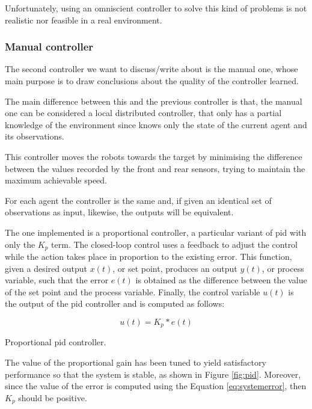 Unfortunately, using an omniscient controller to solve this kind of problems is not 
realistic nor feasible in a real environment.

\subsubsection{Manual controller}
\label{subsubsec:manual}
The second controller we want to discuss/write about is the manual one, whose 
main purpose is to draw conclusions about the quality of the controller learned.

The main difference between this and the previous controller is that, the manual 
one can be considered a local distributed controller, that only has a partial 
knowledge of the environment since knows only the state of the current agent 
and its observations.

This controller moves the robots towards the target by minimising the difference 
between the values recorded by the front and rear sensors, trying to maintain the 
maximum achievable speed.

For each agent the controller is the same and, if given an identical set of 
observations as input, likewise, the outputs will be equivalent.

The one implemented is a proportional controller, a particular variant of \gls{pid}
with only the $K_p$ term. 
The closed-loop control uses a feedback to adjust the control while the action 
takes place in proportion to the existing error. This function, given a desired 
output $x(t)$, or set point, produces an output $y(t)$, or process variable, such 
that the error $e(t)$ is obtained as the difference between the value of the set 
point and the process variable. Finally, the control variable $u(t)$ is the output of 
the \gls{pid} controller and is computed as follows:

\begin{Equation}[!h]
	\centering
	\begin{equation}
	u(t) = K_p * e(t)
	\end{equation}
	\caption[Proportioal PID controller.]{Proportional \gls{pid} controller.}
	\label{eq:pid}
\end{Equation}

The value of the proportional gain has been tuned to yield satisfactory 
performance so that the system is stable, as shown in Figure \ref{fig:pid}. 
Moreover, since the value of the error is computed using the Equation 
\ref{eq:systemerror}, then $K_p$ should be positive.

